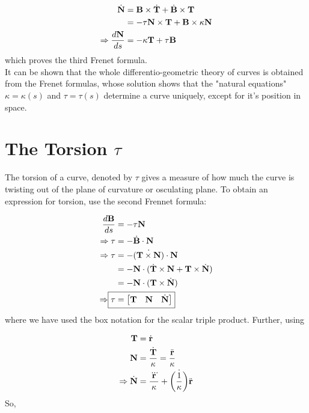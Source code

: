 \documentclass{article}
\begin{document}
\begin{flushleft}
	\begin{align*}
	\dot{\mathbf{N}} &= \mathbf{B} \times \dot{\mathbf{T}} + \dot{\mathbf{B}} \times \mathbf{T}\\
	&= -\tau \mathbf{N} \times \mathbf{T} + \mathbf{B} \times \kappa \mathbf{N}\\
	\Rightarrow  \frac{d\mathbf{N}}{ds} &= -\kappa\mathbf{T} + \tau\mathbf{B}
	\end{align*}
	which proves the third Frenet formula.\\
	It can be shown that the whole differentio-geometric theory of curves is obtained from the Frenet formulas, whose solution shows that the "natural
	equations" $\kappa = \kappa(s)$ and $\tau = \tau(s)$ determine a curve uniquely, except for it's position in space.
	
	
	\color{blue}
	\section{The Torsion $\tau$}
	\color{black}
	
	The torsion of a curve, denoted by $\tau$ gives a measure of how much the curve is twisting out of the plane of curvature or osculating plane. To obtain an expression for torsion, use the second Frennet formula:
	
	\begin{align*}
	    \frac{d\vect{B}}{ds} &= -\tau \vect{N} \\
		\Rightarrow \tau &= -\VectDiff{B}\cdot \vect{N}\\
		\Rightarrow \tau&= -\dot{(\vect{T} \times \vect{N})} \cdot \vect{N}\\
		&= -\vect{N} \cdot (\VectDiff{T} \times \vect{N} + \vect{T} \times \VectDiff{N})\\
		&= -\vect{N} \cdot (\vect{T} \times \VectDiff{N}) \\
		\Rightarrow  \Aboxed{\tau &= {\begin{bmatrix}
			\vect{T} & \vect{N} & \VectDiff{N}
		\end{bmatrix}}}
	\end{align*}
	where we have used the box notation for the scalar triple product. Further, using
	
	\begin{align*}
		\mathbf{T} &= \dot{\mathbf{r}} \\
		\mathbf{N} &= \frac{\dot{\mathbf{T}}}{\kappa} = \frac{\ddot{\mathbf{r}}}{\kappa}\\
		\Rightarrow \dot{\mathbf{N}} &= \frac{\dddot{\mathbf{r}}}{\kappa} + \dot{\left(\frac{1}{\kappa}\right)}\ddot{\mathbf{r}}
	\end{align*}
	So,
	

\end{flushleft}
\end{document}
